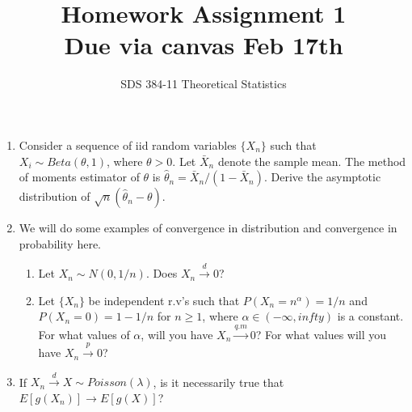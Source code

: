 \documentclass[11pt]{article}
\begin{document}
\title{{\bf Homework Assignment 1}\\Due via canvas Feb 17th}
\author{SDS 384-11 Theoretical Statistics}

\date{}

\maketitle{}
\begin{enumerate}%
\item Consider a sequence of iid random variables $\{X_n\}$ such that $X_i\sim Beta(\theta,1)$, where $\theta>0$. Let $\bar{X}_n$ denote the sample mean. The method of moments estimator of $\theta$ is $\hat{\theta}_n=\bar{X}_n/(1-\bar{X}_n)$. Derive the asymptotic distribution of $\sqrt{n}(\hat{\theta}_n-\theta)$.
\item We will do some examples of convergence in distribution and convergence in probability here.
\begin{enumerate}
	\item Let $X_n\sim N(0,1/n)$. Does $X_n\stackrel{d}{\rightarrow} 0$?
	\item  Let $\{X_n\}$ be independent r.v's such that $P(X_n=n^\alpha)=1/n$ and $P(X_n=0)=1-1/n$ for $n\geq 1$, where $\alpha\in (-\infty,infty)$ is a constant. For what values of $\alpha$, will you have $X_n\stackrel{q.m}{\rightarrow} 0$? For what values will you have $X_n\stackrel{p}{\rightarrow} 0$?
\end{enumerate}
\item If $X_n\stackrel{d}{\rightarrow} X\sim Poisson(\lambda)$, is it necessarily true that $E[g(X_n)]\rightarrow E[g(X)]$?
\begin{enumerate}

\end{enumerate}
\end{enumerate}
\end{document}
